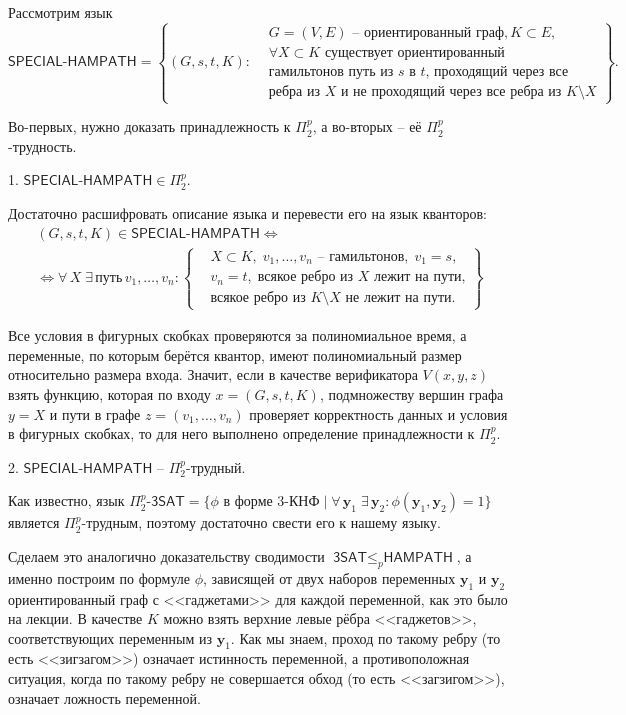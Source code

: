Рассмотрим язык
\[
\textsf{SPECIAL-HAMPATH} = \left\{(G, s, t, K) \colon
\begin{aligned}
    &G = (V, E) \text{ -- ориентированный граф}, K \subset E,\\
    &\forall X \subset K\text{ существует ориентированный}\\
    &\text{гамильтонов путь из $s$ в $t$, проходящий через все}\\
    &\text{ребра из $X$ и не проходящий через все ребра из $K \setminus X$}
\end{aligned}
   \right\}.
\]

Во-первых, нужно доказать принадлежность к $\Pi_2^p$, а во-вторых -- её $\Pi_2^p$-трудность. 

1. $\textsf{SPECIAL-HAMPATH} \in \Pi_2^p$.

Достаточно расшифровать описание языка и перевести его на язык кванторов:
\begin{multline*}
    (G, s, t, K) \in \textsf{SPECIAL-HAMPATH} \Longleftrightarrow\\\Longleftrightarrow \forall \,X\;\exists \,\text{путь} \,v_1, \ldots, v_n\colon 
\left\{
\begin{aligned}
    &X \subset K, \; v_1, \ldots, v_n \text{ -- гамильтонов},\;v_1=s,\\
    &v_n=t,\;\text{всякое ребро из $X$ лежит на пути,}\\
    &\text{всякое ребро из $K \setminus X$ не лежит на пути.}
\end{aligned}
\right\}
\end{multline*}

Все условия в фигурных скобках проверяются за полиномиальное время, а переменные, по которым берётся квантор, имеют полиномиальный размер относительно размера входа. Значит, если в качестве верификатора $V(x, y, z)$ взять функцию, которая по входу $x = (G, s, t, K)$, подмножеству вершин графа $y = X$ и пути в графе $z = (v_1, \ldots, v_n)$ проверяет корректность данных и условия в фигурных скобках, то для него выполнено определение принадлежности к $\Pi_2^p$.

2. $\textsf{SPECIAL-HAMPATH}$ -- $\Pi_2^p$-трудный.

Как известно, язык
$
\Pi_2^p\textsf{-3SAT} = \{\phi\text{ в форме 3-КНФ}\mid \forall\,\mathbf{y}_1\;\exists\, \mathbf{y}_2\colon \phi(\mathbf{y}_1, \mathbf{y}_2)=1\}
$ является $\Pi_2^p$-трудным, поэтому достаточно свести его к нашему языку.

Сделаем это аналогично доказательству сводимости $\textsf{3SAT} \le_p \textsf{HAMPATH}$, а именно построим по формуле $\phi$, зависящей от двух наборов переменных $\mathbf{y}_1$ и $\mathbf{y}_2$ ориентированный граф с <<гаджетами>> для каждой переменной, как это было на лекции. В качестве $K$ можно взять верхние левые рёбра <<гаджетов>>, соответствующих переменным из $\mathbf{y}_1$. Как мы знаем, проход по такому ребру (то есть <<зигзагом>>) означает истинность переменной, а противоположная ситуация, когда по такому ребру не совершается обход (то есть <<загзигом>>), означает ложность переменной.

